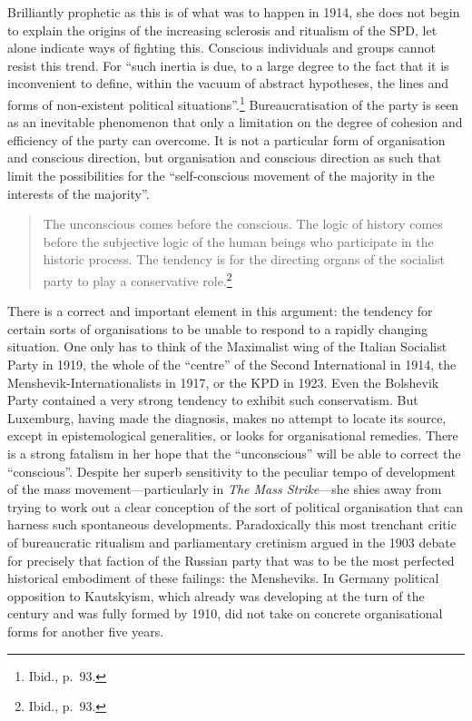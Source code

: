 Brilliantly prophetic as this is of what was to happen in 1914, she does not begin to explain the origins of the increasing sclerosis and ritualism of the SPD, let alone indicate ways of fighting this. Conscious individuals and groups cannot resist this trend. For ``such inertia is due, to a large degree to the fact that it is inconvenient to define, within the vacuum of abstract hypotheses, the lines and forms of non-existent political situations''.\footnote{Ibid., p.~93.} Bureaucratisation of the party is seen as an inevitable phenomenon that only a limitation on the degree of cohesion and efficiency of the party can overcome. It is not a particular form of organisation and conscious direction, but organisation and conscious direction as such that limit the possibilities for the ``self-conscious movement of the majority in the interests of the majority''.

\blockquote{The unconscious comes before the conscious. The logic of history comes before the subjective logic of the human beings who participate in the historic process. The tendency is for the directing organs of the socialist party to play a conservative role.\footnote{Ibid., p.~93.}}

There is a correct and important element in this argument: the tendency for certain sorts of organisations to be unable to respond to a rapidly changing situation. One only has to think of the Maximalist wing of the Italian Socialist Party in 1919, the whole of the ``centre'' of the Second International in 1914, the Menshevik-Internationalists in 1917, or the KPD in 1923. Even the Bolshevik Party contained a very strong tendency to exhibit such conservatism. But Luxemburg, having made the diagnosis, makes no attempt to locate its source, except in epistemological generalities, or looks for organisational remedies. There is a strong fatalism in her hope that the ``unconscious'' will be able to correct the ``conscious''. Despite her superb sensitivity to the peculiar tempo of development of the mass movement---particularly in \emph{The Mass Strike}---she shies away from trying to work out a clear conception of the sort of political organisation that can harness such spontaneous developments. Paradoxically this most trenchant critic of bureaucratic ritualism and parliamentary cretinism argued in the 1903 debate for precisely that faction of the Russian party that was to be the most perfected historical embodiment of these failings: the Mensheviks. In Germany political opposition to Kautskyism, which already was developing at the turn of the century and was fully formed by 1910, did not take on concrete organisational forms for another five years.

